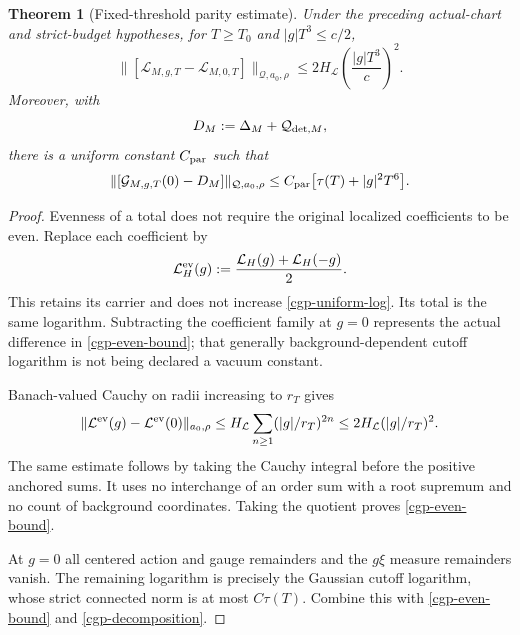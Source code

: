 \documentclass[11pt]{article}
\newtheorem{theorem}{Theorem}[section]
\theoremstyle{remark}
\begin{document}
\begin{theorem}[Fixed-threshold parity estimate]
\label{cgp-theorem}
Under the preceding actual-chart and strict-budget hypotheses,
for $T\ge T_0$ and $|g|T^3\le c/2$,
\begin{equation}
 \|[\mathcal L_{M,g,T}-\mathcal L_{M,0,T}]
                     \|_{\mathcal Q,a_0,\rho}
       \le 2H_{\mathcal L}
                       \left(\frac{|g|T^3}{c}\right)^2.
 \label{cgp-even-bound}
\end{equation}
Moreover, with
\begin{equation}
                D_M:=\Delta_M+\mathcal Q_{{\rm det},M},
 \label{cgp-leading-definition}
\end{equation}
there is a uniform constant $C_{\rm par}$ such that
\begin{equation}
 \|[\mathcal G_{M,g,T}(0)-D_M]\|_{\mathcal Q,a_0,\rho}
                 \le C_{\rm par}\bigl[\tau(T)+|g|^2T^6\bigr].
 \label{cgp-leading-bound}
\end{equation}
\end{theorem}
\begin{proof}
Evenness of a total does not require the original localized
coefficients to be even. Replace each coefficient by
\begin{equation}
 \mathcal L_H^{\rm ev}(g)
        :=\frac{\mathcal L_H(g)+\mathcal L_H(-g)}2.
 \label{cgp-even-representative}
\end{equation}
This retains its carrier and does not increase
\eqref{cgp-uniform-log}. Its total is the same logarithm.
Subtracting the coefficient family at $g=0$ represents the
actual difference in \eqref{cgp-even-bound}; that generally
background-dependent cutoff logarithm is not being declared
a vacuum constant.

Banach-valued Cauchy on radii increasing to $r_T$ gives
\begin{equation}
 \|\mathcal L^{\rm ev}(g)-\mathcal L^{\rm ev}(0)\|_{a_0,\rho}
 \le H_{\mathcal L}\sum_{n\ge1}(|g|/r_T)^{2n}
 \le2H_{\mathcal L}(|g|/r_T)^2.
 \label{cgp-Cauchy-proof}
\end{equation}
The same estimate follows by taking the Cauchy integral before
the positive anchored sums. It uses no interchange of an
order sum with a root supremum and no count of background
coordinates. Taking the quotient proves
\eqref{cgp-even-bound}.

At $g=0$ all centered action and gauge remainders and the
$g\xi$ measure remainders vanish. The remaining logarithm is
precisely the Gaussian cutoff logarithm, whose strict
connected norm is at most $C\tau(T)$. Combine this with
\eqref{cgp-even-bound} and \eqref{cgp-decomposition}.
\end{proof}
\end{document}
